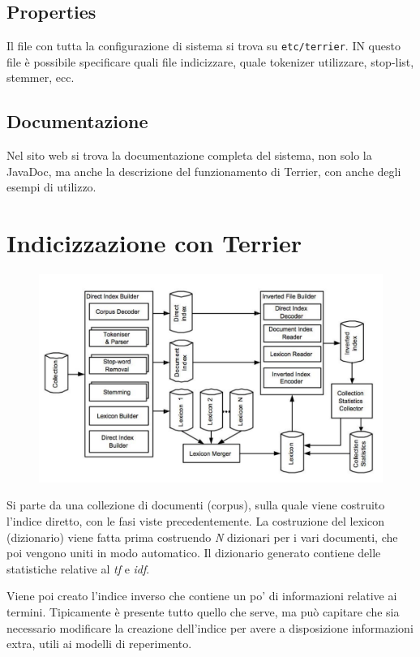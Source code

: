 \subsection{Properties}

Il file con tutta la configurazione di sistema si trova su \texttt{etc/terrier}.
IN questo file è possibile specificare quali file indicizzare, quale tokenizer utilizzare, stop-list, stemmer, ecc.


\subsection{Documentazione}

Nel sito web si trova la documentazione completa del sistema, non solo la JavaDoc, ma anche la descrizione del funzionamento di Terrier, con anche degli esempi di utilizzo.

\section{Indicizzazione con Terrier}

\begin{figure}[htbp]
	\centering
	\includegraphics[width=0.9\linewidth]{images/l12-fig-1.png}
\end{figure}

Si parte da una collezione di documenti (corpus), sulla quale viene costruito l'indice diretto, con le fasi viste precedentemente.
La costruzione del lexicon (dizionario) viene fatta prima costruendo \textit{N} dizionari per i vari documenti, che poi vengono uniti in modo automatico. Il dizionario generato contiene delle statistiche relative al \textit{tf} e \textit{idf}.

Viene poi creato l'indice inverso che contiene un po' di informazioni relative ai termini. Tipicamente è presente tutto quello che serve, ma può capitare che sia necessario modificare la creazione dell'indice per avere a disposizione informazioni extra, utili ai modelli di reperimento.

